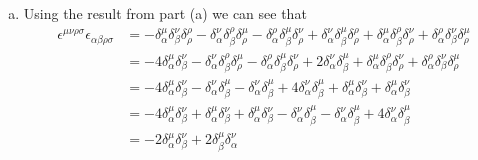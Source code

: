 \documentclass[11pt]{article}
\numberwithin{equation}{section}
\begin{document}
\begin{enumerate}[(a)]
\item
    Using the result from part (a) we can see that
    \begin{align*}
        \epsilon^{\mu\nu\rho\sigma}\epsilon_{\alpha\beta\rho\sigma} &= 
            -\delta^{\mu}_{\alpha}\delta^{\nu}_{\beta}\delta^{\rho}_{\rho}
            -\delta^{\nu}_{\alpha}\delta^{\rho}_{\beta}\delta^{\mu}_{\rho}
            -\delta^{\rho}_{\alpha}\delta^{\mu}_{\beta}\delta^{\nu}_{\rho}
            +\delta^{\nu}_{\alpha}\delta^{\mu}_{\beta}\delta^{\rho}_{\rho}
            +\delta^{\mu}_{\alpha}\delta^{\rho}_{\beta}\delta^{\nu}_{\rho}
            +\delta^{\rho}_{\alpha}\delta^{\nu}_{\beta}\delta^{\mu}_{\rho}\\
            &= -4\delta^{\mu}_{\alpha}\delta^{\nu}_{\beta}
            -\delta^{\nu}_{\alpha}\delta^{\rho}_{\beta}\delta^{\mu}_{\rho}
            -\delta^{\rho}_{\alpha}\delta^{\mu}_{\beta}\delta^{\nu}_{\rho}
            +2\delta^{\nu}_{\alpha}\delta^{\mu}_{\beta}
            +\delta^{\mu}_{\alpha}\delta^{\rho}_{\beta}\delta^{\nu}_{\rho}
            +\delta^{\rho}_{\alpha}\delta^{\nu}_{\beta}\delta^{\mu}_{\rho}\\
            &= -4\delta^{\mu}_{\alpha}\delta^{\nu}_{\beta}
            -\delta^{\nu}_{\alpha}\delta^{\mu}_{\beta}
            -\delta^{\nu}_{\alpha}\delta^{\mu}_{\beta}
            +4\delta^{\nu}_{\alpha}\delta^{\mu}_{\beta}
            +\delta^{\mu}_{\alpha}\delta^{\nu}_{\beta}
            +\delta^{\mu}_{\alpha}\delta^{\nu}_{\beta}\\
            &= -4\delta^{\mu}_{\alpha}\delta^{\nu}_{\beta}
            +\delta^{\mu}_{\alpha}\delta^{\nu}_{\beta}
            +\delta^{\mu}_{\alpha}\delta^{\nu}_{\beta}
            -\delta^{\nu}_{\alpha}\delta^{\mu}_{\beta}
            -\delta^{\nu}_{\alpha}\delta^{\mu}_{\beta}
            +4\delta^{\nu}_{\alpha}\delta^{\mu}_{\beta}\\
            &= -2\delta^{\mu}_{\alpha}\delta^{\nu}_{\beta} +2\delta^{\mu}_{\beta}\delta^{\nu}_{\alpha}
    \end{align*}


\end{enumerate}
\end{document}
